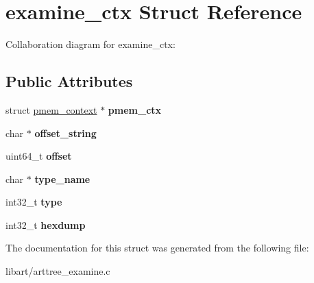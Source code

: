 \hypertarget{structexamine__ctx}{}\section{examine\+\_\+ctx Struct Reference}
\label{structexamine__ctx}


Collaboration diagram for examine\+\_\+ctx\+:
\subsection*{Public Attributes}
\begin{DoxyCompactItemize}
\item 
\mbox{\label{structexamine__ctx_a3fbc6138bd215b73904626ba1e00ba7d}} 
struct \hyperlink{structpmem__context}{pmem\+\_\+context} $\ast$ {\bfseries pmem\+\_\+ctx}
\item 
\mbox{\label{structexamine__ctx_abbcea7810c58839ecf6561f23a47e063}} 
char $\ast$ {\bfseries offset\+\_\+string}
\item 
\mbox{\label{structexamine__ctx_a596b7f4ec335d61033c5110f555acc36}} 
uint64\+\_\+t {\bfseries offset}
\item 
\mbox{\label{structexamine__ctx_a85c40b081b19ae7dcbdcca4f97746935}} 
char $\ast$ {\bfseries type\+\_\+name}
\item 
\mbox{\label{structexamine__ctx_a577989f9998f6b30313299e8d9b33665}} 
int32\+\_\+t {\bfseries type}
\item 
\mbox{\label{structexamine__ctx_a06b7f7e343eca90dc385ec7e0a222aa4}} 
int32\+\_\+t {\bfseries hexdump}
\end{DoxyCompactItemize}


The documentation for this struct was generated from the following file\+:\begin{DoxyCompactItemize}
\item 
libart/arttree\+\_\+examine.\+c\end{DoxyCompactItemize}
